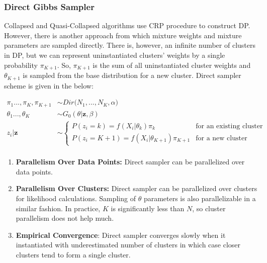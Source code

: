 \documentclass[12pt, a4paper]{article}
\begin{document}
\subsubsection{Direct Gibbs Sampler}

Collapsed and Quasi-Collapsed algorithms use CRP procedure to construct DP. However, there is another approach from which mixture weights and mixture parameters are sampled directly. There is, however, an infinite number of clusters in DP, but we can represent uninstantiated clusters' weights by a single probability $\pi_{K+1}$. So, $\pi_{K+1}$ is the sum of all uninstantiated cluster weights and $\theta_{K+1}$ is sampled from the base distribution for a new cluster. Direct sampler scheme is given in the below:

\begin{align*}
\pi_1...,\pi_K, \pi_{K+1} &\sim Dir\big(N_1,...,N_K, \alpha \big) \\
\theta_1...,\theta_K&\sim G_0(\theta|\boldsymbol z, \beta) \\
z_i|\boldsymbol z &\sim \begin{cases}
P(z_i=k)= f(X_i|\theta_{k})\pi_k & \text{for an existing cluster} \\
P(z_i=K+1)= f(X_i|\theta_{K+1})\pi_{K+1}& \text{for a new cluster}
\end{cases}\\
\end{align*}

\begin{enumerate}
   \item  \textbf{Parallelism Over Data Points:} Direct sampler can be parallelized over data points.
   \item  \textbf{Parallelism Over Clusters:} Direct sampler can be parallelized over clusters for likelihood calculations. Sampling of $\theta$ parameters is also parallelizable in a similar fashion. In practice, $K$ is significantly less than $N$, so cluster parallelism does not help much.
   \item  \textbf{Empirical Convergence}:
  Direct sampler converges slowly when it instantiated with underestimated
  number of clusters in which case closer clusters tend to form a single cluster.
\end{enumerate}
\end{document}

